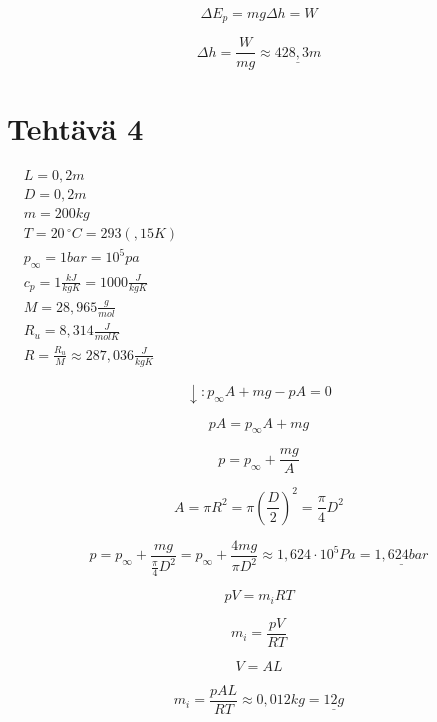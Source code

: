 \documentclass[12pt,a4paper,finnish]{article}
\begin{document}
\begin{equation}
 \Delta E_p = mg\Delta h = W
\end{equation}

\begin{equation}
 \Delta h = \frac{W}{mg} \approx \underline{428,3 m}
\end{equation}

\section{Tehtävä 4}

\begin{math}
 \begin{aligned}
  &L = 0,2m\\
  &D = 0,2m\\
  &m = 200kg\\
  &T = 20\,^{\circ}C = 293(,15K )\\
  &p_\infty = 1 bar = 10^5 pa\\
  &c_p = 1\frac{kJ}{kgK} = 1000 \frac{J}{kgK}\\
  &M = 28,965\frac{g}{mol}\\
  &R_u = 8,314\frac{J}{molK}\\
  &R = \frac{R_u}{M} \approx 287,036 \frac{J}{kgK}
 \end{aligned}
\end{math}

\begin{equation}
 \downarrow: p_\infty A + mg - pA = 0
\end{equation}

\begin{equation}
 pA = p_\infty A + mg
\end{equation}

\begin{equation}
 p = p_\infty + \frac{mg}{A}
\end{equation}

\begin{equation}
 A = \pi R^2 = \pi \left(\frac{D}{2}\right)^2 = \frac{\pi}{4}D^2
\end{equation}

\begin{equation}
 p = p_\infty + \frac{mg}{\frac{\pi}{4}D^2} = p_\infty + \frac{4mg}{\pi D^2} \approx 1,624\cdot10^5Pa = \underline{1,624 bar}
\end{equation}

\begin{equation}
 pV = m_iRT
\end{equation}

\begin{equation}
 m_i = \frac{pV}{RT}
\end{equation}

\begin{equation}
 V = AL
\end{equation}

\begin{equation}
 m_i = \frac{pAL}{RT} \approx 0,012kg = \underline{12g}
\end{equation}
\end{document}
